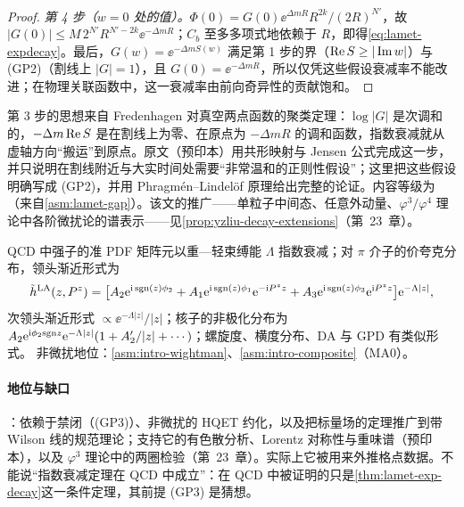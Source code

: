 \begin{proof}
\emph{第 4 步（$w=0$ 处的值）。}$\Phi(0)=G(0)\ee^{\Delta mR}R^{2k}/(2R)^{N'}$，故 $|G(0)|\le M\,2^{N'}R^{N'-2k}\ee^{-\Delta mR}$；$C_b$ 至多多项式地依赖于 $R$，即得\cref{eq:lamet-expdecay}。最后，$G(w)=\ee^{-\Delta mS(w)}$ 满足第 1 步的界（$\operatorname{Re} S\ge|\operatorname{Im} w|$）与 (GP2)（割线上 $|G|=1$），且 $G(0)=\ee^{-\Delta mR}$，所以仅凭这些假设衰减率不能改进；在物理关联函数中，这一衰减率由前向奇异性的贡献饱和\cite{Ji:2026vir}。
\end{proof}

第 3 步的思想来自 Fredenhagen 对真空两点函数的聚类定理\cite{Fredenhagen:1984bz}：$\log|G|$ 是次调和的，$-\Delta m\operatorname{Re} S$ 是在割线上为零、在原点为 $-\Delta mR$ 的调和函数，指数衰减就从虚轴方向“搬运”到原点。原文\cite[第~5.1~节]{Ji:2026vir}（预印本）用共形映射与 Jensen 公式完成这一步，并只说明在割线附近与大实时间处需要“非常温和的正则性假设”；这里把这些假设明确写成 (GP2)，并用 Phragmén--Lindelöf 原理给出完整的论证。内容等级为 \tagC（来自\cref{asm:lamet-gap}）。该文的推广——单粒子中间态、任意外动量、$\varphi^3/\varphi^4$ 理论中各阶微扰论的谱表示——见\cref{prop:yzliu-decay-extensions}（第~23~章）。

\begin{conjecture}\label{conj:lamet-decay-qcd}
QCD 中强子的准 PDF 矩阵元以重—轻束缚能 $\Lambda$ 指数衰减；对 $\pi$ 介子的价夸克分布，领头渐近形式为
\begin{equation}\label{eq:lamet-LA}
\tilde h^{\rm LA}(z,P^z)=\big[A_2\mathrm{e}^{\mathrm{i}\,{\rm sgn}(z)\phi_2}+A_1\mathrm{e}^{\mathrm{i}\,{\rm sgn}(z)\phi_1}\mathrm{e}^{-\mathrm{i} P^zz}+A_3\mathrm{e}^{\mathrm{i}\,{\rm sgn}(z)\phi_3}\mathrm{e}^{\mathrm{i} P^zz}\big]\mathrm{e}^{-\Lambda|z|},
\end{equation}%
次领头渐近形式 $\propto\ee^{-\Lambda|z|}/|z|$；核子的非极化分布为 $A_2\mathrm{e}^{\mathrm{i}\phi_2{\rm sgn}z}\mathrm{e}^{-\Lambda|z|}(1+A_2'/|z|+\cdots)$；螺旋度、横度分布、DA 与 GPD 有类似形式。
非微扰地位：\cref{asm:intro-wightman}、\cref{asm:intro-composite}（MA0）。
\end{conjecture}

\paragraph{地位与缺口}
\tagC：依赖于禁闭（(GP3)）、非微扰的 HQET 约化，以及把标量场的定理推广到带 Wilson 线的规范理论；支持它的有色散分析、Lorentz 对称性与重味谱\cite[第~2--3~节]{Ji:2026vir}（预印本），以及 $\varphi^3$ 理论中的两圈检验（第~23~章）。实际上它被用来外推格点数据\cite{Gao:2021dbh,Su:2022fiu}。不能说“指数衰减定理在 QCD 中成立”：在 QCD 中被证明的只是\cref{thm:lamet-exp-decay}这一条件定理，其前提 (GP3) 是猜想。

